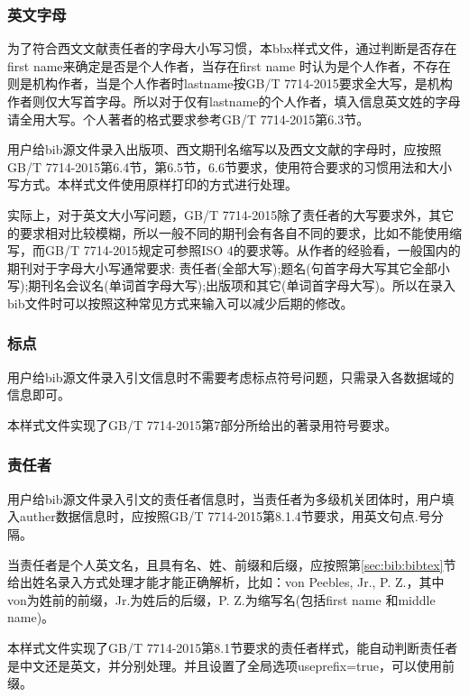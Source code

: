\subsubsection{英文字母}\label{sec:fmt:lettercase}

\begin{property}{}{}
为了符合西文文献责任者的字母大小写习惯，本bbx样式文件，通过判断是否存在first name来确定是否是个人作者，当存在first name 时认为是个人作者，不存在则是机构作者，当是个人作者时lastname按GB/T 7714-2015要求全大写，是机构作者则仅大写首字母。所以对于仅有lastname的个人作者，填入信息英文姓的字母请全用大写。个人著者的格式要求参考GB/T 7714-2015第6.3节。

用户给bib源文件录入出版项、西文期刊名缩写以及西文文献的字母时，应按照GB/T 7714-2015第6.4节，第6.5节，6.6节要求，使用符合要求的习惯用法和大小写方式。本样式文件使用原样打印的方式进行处理。

实际上，对于英文大小写问题，GB/T 7714-2015除了责任者的大写要求外，其它的要求相对比较模糊，所以一般不同的期刊会有各自不同的要求，比如不能使用缩写，而GB/T 7714-2015规定可参照ISO 4的要求等。从作者的经验看，一般国内的期刊对于字母大小写通常要求:
责任者(全部大写);题名(句首字母大写其它全部小写);期刊名会议名(单词首字母大写);出版项和其它(单词首字母大写)。所以在录入bib文件时可以按照这种常见方式来输入可以减少后期的修改。
\end{property}

\subsubsection{标点}

\begin{property}{}{}
用户给bib源文件录入引文信息时不需要考虑标点符号问题，只需录入各数据域的信息即可。

本样式文件实现了GB/T 7714-2015第7部分所给出的著录用符号要求。
\end{property}

\subsubsection{责任者}

\begin{property}{}{}
用户给bib源文件录入引文的责任者信息时，当责任者为多级机关团体时，用户填入auther数据信息时，应按照GB/T 7714-2015第8.1.4节要求，用英文句点.号分隔。

当责任者是个人英文名，且具有名、姓、前缀和后缀，应按照第\ref{sec:bib:bibtex}节给出姓名录入方式处理才能才能正确解析，比如：von Peebles, Jr., P. Z.，其中von为姓前的前缀，Jr.为姓后的后缀，P. Z.为缩写名(包括first name 和middle name)。

本样式文件实现了GB/T 7714-2015第8.1节要求的责任者样式，能自动判断责任者是中文还是英文，并分别处理。并且设置了全局选项useprefix=true，可以使用前缀。
\end{property}

